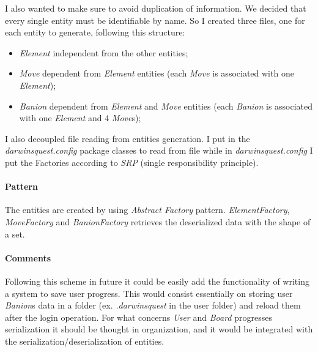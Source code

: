 \documentclass[12pt, a4paper]{report}
\begin{document}
            I also wanted to make sure to avoid duplication of information.
            We decided that every single entity must be identifiable by name.
            So I created three files, one for each entity to generate, following this structure:
            \begin{itemize}
                \item \emph{Element} \textrightarrow independent from the other entities;
                \item \emph{Move} \textrightarrow dependent from \emph{Element} entities (each \emph{Move} is associated with one \emph{Element});
                \item \emph{Banion} \textrightarrow dependent from \emph{Element} and \emph{Move} entities (each \emph{Banion} is associated with one \emph{Element} and 4 \emph{Move}s);
            \end{itemize}

            I also decoupled file reading from entities generation.
            I put in the \textit{darwinsquest.config} package classes to read from file while in \textit{darwinsquest.config} I put the Factories according to \emph{SRP} (single responsibility principle).

            \paragraph{Pattern}

            The entities are created by using \emph{Abstract Factory} pattern.
            \emph{ElementFactory}, \emph{MoveFactory} and \emph{BanionFactory} retrieves the deserialized data with the shape of a set.

            \paragraph{Comments}

            Following this scheme in future it could be easily add the functionality of writing a system to save user progress.
            This would consist essentially on storing user \emph{Banion}s data in a folder (ex. \emph{.darwinsquest} in the user folder) and reload them after the login operation.
            For what concerns \emph{User} and \emph{Board} progresses serialization it should be thought in organization, and it would be integrated with the serialization/deserialization of entities.

        \pagebreak
\end{document}
